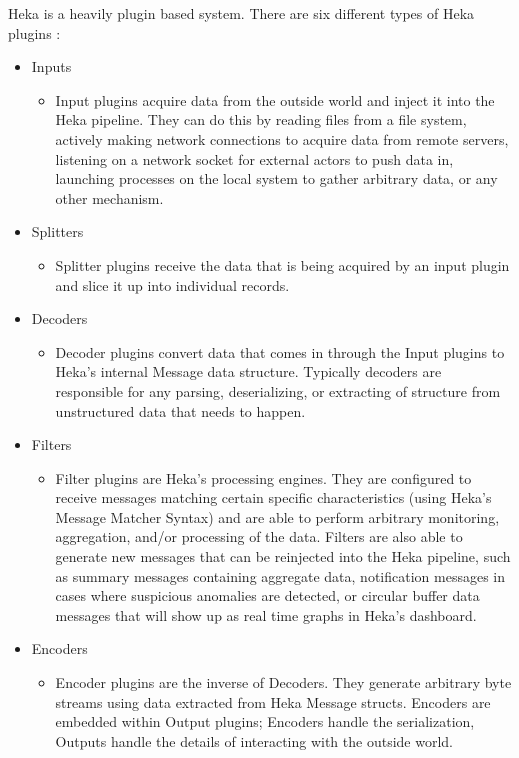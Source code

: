 Heka is a heavily plugin based system. There are six different types of Heka plugins \cite{heka}:
\begin{itemize}
  \item	Inputs
    \begin{itemize}
      \item Input plugins acquire data from the outside world and inject it into the Heka pipeline. They can do this by reading files from a file system, actively making network connections to acquire data from remote servers, listening on a network socket for external actors to push data in, launching processes on the local system to gather arbitrary data, or any other mechanism.
    \end{itemize}
  \item	Splitters
    \begin{itemize}
      \item Splitter plugins receive the data that is being acquired by an input plugin and slice it up into individual records.
    \end{itemize}
  \item	Decoders
    \begin{itemize}
      \item Decoder plugins convert data that comes in through the Input plugins to Heka’s internal Message data structure. Typically decoders are responsible for any parsing, deserializing, or extracting of structure from unstructured data that needs to happen.
    \end{itemize}    
  \item Filters
    \begin{itemize}
      \item Filter plugins are Heka’s processing engines. They are configured to receive messages matching certain specific characteristics (using Heka’s Message Matcher Syntax) and are able to perform arbitrary monitoring, aggregation, and/or processing of the data. Filters are also able to generate new messages that can be reinjected into the Heka pipeline, such as summary messages containing aggregate data, notification messages in cases where suspicious anomalies are detected, or circular buffer data messages that will show up as real time graphs in Heka’s dashboard. 
    \end{itemize}
  \item	Encoders
    \begin{itemize}
      \item Encoder plugins are the inverse of Decoders. They generate arbitrary byte streams using data extracted from Heka Message structs. Encoders are embedded within Output plugins; Encoders handle the serialization, Outputs handle the details of interacting with the outside world.

\end{itemize}
\end{itemize}
